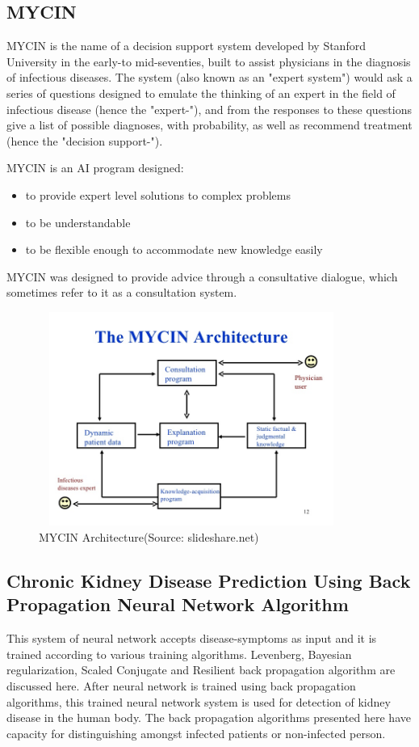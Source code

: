 \subsection{MYCIN}
MYCIN is the name of a decision support system developed by Stanford University in the early-to mid-seventies, built to assist physicians in the diagnosis of infectious diseases. The system (also known as an "expert system") would ask a series of questions designed to emulate the thinking of an expert in the field of infectious disease (hence the "expert-"), and from the responses to these questions give a list of possible diagnoses, with probability, as well as recommend treatment (hence the "decision support-").\par 
MYCIN is an AI program designed: 
\begin{itemize}
    \item to provide expert level solutions to complex problems
    \item to be understandable
    \item to be flexible enough to accommodate new knowledge easily
\end{itemize}
MYCIN was designed to provide advice through a consultative dialogue, which sometimes refer to it as a consultation system.

\begin{figure}[H]
\begin{center}
\includegraphics[width=100mm, height = 70mm]{images/mycin.jpg}
\caption{MYCIN Architecture(Source: slideshare.net)}
\end{center}
\end{figure}
\subsection{Chronic Kidney Disease Prediction Using Back Propagation Neural Network Algorithm}
This system of neural network accepts disease-symptoms as input and it is trained according to various training algorithms. Levenberg, Bayesian regularization, Scaled Conjugate and Resilient back propagation algorithm are discussed here. After neural network is trained using back propagation algorithms, this trained neural network system is used for detection of kidney disease in the human body. The back propagation algorithms presented here have capacity for distinguishing amongst infected patients or non-infected person.
